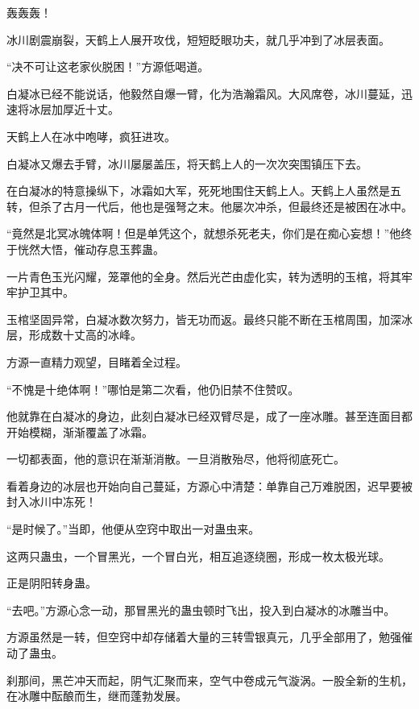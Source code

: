 
\begin{this_body}



轰轰轰！

冰川剧震崩裂，天鹤上人展开攻伐，短短眨眼功夫，就几乎冲到了冰层表面。

“决不可让这老家伙脱困！”方源低喝道。

白凝冰已经不能说话，他毅然自爆一臂，化为浩瀚霜风。大风席卷，冰川蔓延，迅速将冰层加厚近十丈。

天鹤上人在冰中咆哮，疯狂进攻。

白凝冰又爆去手臂，冰川屡屡盖压，将天鹤上人的一次次突围镇压下去。

在白凝冰的特意操纵下，冰霜如大军，死死地围住天鹤上人。天鹤上人虽然是五转，但杀了古月一代后，他也是强弩之末。他屡次冲杀，但最终还是被困在冰中。

“竟然是北冥冰魄体啊！但是单凭这个，就想杀死老夫，你们是在痴心妄想！”他终于恍然大悟，催动存息玉葬蛊。

一片青色玉光闪耀，笼罩他的全身。然后光芒由虚化实，转为透明的玉棺，将其牢牢护卫其中。

玉棺坚固异常，白凝冰数次努力，皆无功而返。最终只能不断在玉棺周围，加深冰层，形成数十丈高的冰峰。

方源一直精力观望，目睹着全过程。

“不愧是十绝体啊！”哪怕是第二次看，他仍旧禁不住赞叹。

他就靠在白凝冰的身边，此刻白凝冰已经双臂尽是，成了一座冰雕。甚至连面目都开始模糊，渐渐覆盖了冰霜。

一切都表面，他的意识在渐渐消散。一旦消散殆尽，他将彻底死亡。

看着身边的冰层也开始向自己蔓延，方源心中清楚：单靠自己万难脱困，迟早要被封入冰川中冻死！

“是时候了。”当即，他便从空窍中取出一对蛊虫来。

这两只蛊虫，一个冒黑光，一个冒白光，相互追逐绕圈，形成一枚太极光球。

正是阴阳转身蛊。

“去吧。”方源心念一动，那冒黑光的蛊虫顿时飞出，投入到白凝冰的冰雕当中。

方源虽然是一转，但空窍中却存储着大量的三转雪银真元，几乎全部用了，勉强催动了蛊虫。

刹那间，黑芒冲天而起，阴气汇聚而来，空气中卷成元气漩涡。一股全新的生机，在冰雕中酝酿而生，继而蓬勃发展。


\end{this_body}
